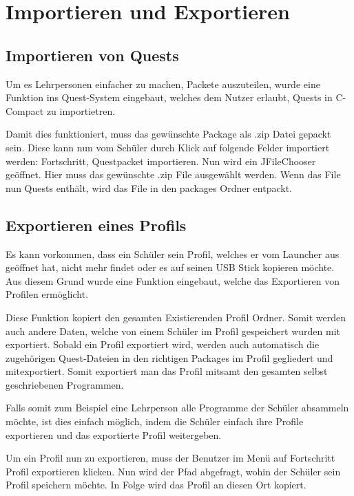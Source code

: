 \section{Importieren und Exportieren}
\subsection{Importieren von Quests}
Um es Lehrpersonen einfacher zu machen, Packete auszuteilen, wurde eine Funktion ins Quest-System eingebaut, welches dem Nutzer erlaubt, Quests in C-Compact zu importietren.

Damit dies funktioniert, muss das gewünschte Package als .zip Datei gepackt sein. Diese kann nun vom Schüler durch Klick auf folgende Felder importiert werden: Fortschritt, Questpacket importieren. Nun wird ein JFileChooser geöffnet. Hier muss das gewünschte .zip File ausgewählt werden. Wenn das File nun Quests enthält, wird das File in den packages Ordner entpackt.

\subsection{Exportieren eines Profils}
Es kann vorkommen, dass ein Schüler sein Profil, welches er vom Launcher aus geöffnet hat, nicht mehr findet oder es auf seinen USB Stick kopieren möchte. Aus diesem Grund wurde eine Funktion eingebaut, welche das Exportieren von Profilen ermöglicht.

Diese Funktion kopiert den gesamten Existierenden Profil Ordner. Somit werden auch andere Daten, welche von einem Schüler im Profil gespeichert wurden mit exportiert. Sobald ein Profil exportiert wird, werden auch automatisch die zugehörigen Quest-Dateien in den richtigen Packages im Profil gegliedert und mitexportiert. Somit exportiert man das Profil mitsamt den gesamten selbst geschriebenen Programmen.

Falls somit zum Beispiel eine Lehrperson alle Programme der Schüler absammeln möchte, ist dies einfach möglich, indem die Schüler einfach ihre Profile exportieren und das exportierte Profil weitergeben.

Um ein Profil nun zu exportieren, muss der Benutzer im Menü auf Fortschritt Profil exportieren klicken. Nun wird der Pfad abgefragt, wohin der Schüler sein Profil speichern möchte. In Folge wird das Profil an diesen Ort kopiert.